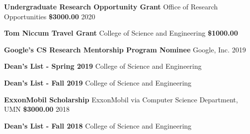 \newpage
{}

\begin{cvhonors}

  \cvhonor
    {\textbf{Undergraduate Research Opportunity Grant}} %
    {Office of Research Opportunities} %
    {\textbf{\$3000.00}} %
    {2020} %

  \cvhonor
    {\textbf{Tom Niccum Travel Grant}} %
    {College of Science and Engineering} %
    {\textbf{\$1000.00}} %
    {} %

\end{cvhonors}


\begin{cvhonors}
  \cvhonor
    {\textbf{Google’s CS Research Mentorship Program Nominee}} %
    {Google, Inc.} %
    {} %
    {2019} %
    
  \cvhonor
    {\textbf{Dean’s List - Spring 2019}} %
    {College of Science and Engineering} %
    {} %
    {} %

  \cvhonor
    {\textbf{Dean’s List - Fall 2019}} %
    {College of Science and Engineering} %
    {} %
    {} %

\end{cvhonors}


\begin{cvhonors}

  \cvhonor
    {\textbf{ExxonMobil Scholarship }} %
    {ExxonMobil via Computer Science Department, UMN} %
    {\textbf{\$3000.00}} %
    {2018} %

  \cvhonor
    {\textbf{Dean’s List - Fall 2018}} %
    {College of Science and Engineering} %
    {} %
    {} %

\end{cvhonors}


